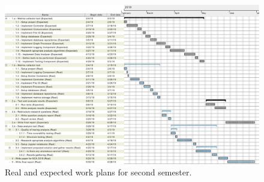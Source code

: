 \begin{landscape}
    \begin{figure}
        \includegraphics[height=1.0\textheight]{images/complete_work_plan_semester_2.pdf}
        \caption{Real and expected work plans for second semester.}
        \label{fig:complete_work_plan_semester_2}
    \end{figure}
\end{landscape}

\checkoddpage
{}
{ %
    \newpage
    \blankpage}
{ %
}